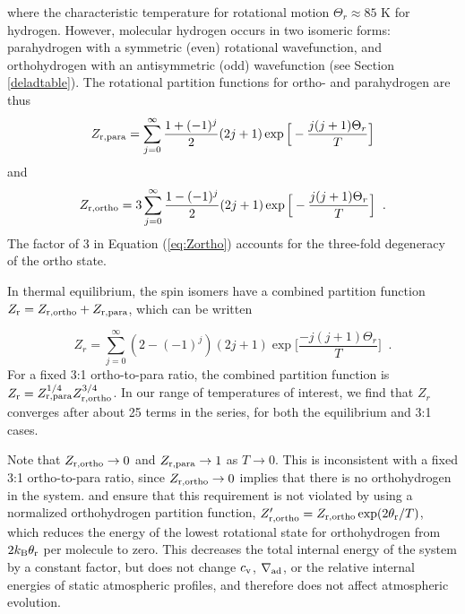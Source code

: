 \noindent where the characteristic temperature for rotational motion $\Theta_r \approx 85$ K  for hydrogen. However, molecular hydrogen occurs in two isomeric forms: parahydrogen with a symmetric (even) rotational wavefunction, and orthohydrogen with an antisymmetric (odd) wavefunction (see Section \ref{deladtable}). %
The rotational partition functions for ortho- and parahydrogen are thus
\begin{equation}
\label{eq:Zpara}
Z_{\rm{r,para}}=\sum_{j=0}^\infty \frac{1+(-1)^j}{2} (2 j +1) \exp\Big[-\frac{j(j+1)\Theta_r}{T}\Big]
\end{equation}
and
\begin{equation}
\label{eq:Zortho}
Z_{\rm{r,ortho}}=3\sum_{j=0}^\infty \frac{1-(-1)^j}{2} (2 j +1) \exp\Big[-\frac{j(j+1)\Theta_r}{T}\Big] \;\;.
\end{equation}
The factor of 3 in Equation (\ref{eq:Zortho}) accounts for the three-fold degeneracy of the ortho state.

 In thermal equilibrium, the spin isomers have a combined partition function $Z_{\rm r}=Z_{\rm{r, ortho}}+Z_{\rm{r,para}}$, which can be written

\begin{equation}
\label{eq:Zrspin}
Z_r=\sum_{j=0}^\infty (2-(-1)^j) (2j+1) \exp{\Big[\frac{-j (j+1) \Theta_r}{T}\Big]} \;\;.
\end{equation}
For a fixed 3:1 ortho-to-para ratio, the combined partition function is $Z_{\rm r}=Z_{\rm r,para}^{1/4} Z_{\rm r, ortho}^{3/4}$. In our range of temperatures of interest, we find that $Z_r$ converges after about 25 terms in the series, for both the equilibrium and 3:1 cases.

Note that $Z_{\rm r, ortho} \rightarrow 0$ and $Z_{\rm r,para} \rightarrow 1$ as $T \rightarrow 0$. This is inconsistent with a fixed 3:1 ortho-to-para ratio, since $Z_{\rm r, ortho} \rightarrow 0$ implies that there is no orthohydrogen in the system. \citet{boley07} and \citet{dangelo13} ensure that this requirement is not violated by using a normalized orthohydrogen partition function,  $Z'_{\rm r, ortho}=Z_{\rm r, ortho} \exp(2 \theta_{\rm r}/T)$, which reduces the energy of the lowest rotational state for orthohydrogen from $2k_{\rm B}\theta_{\rm r}$ per molecule to zero. This decreases the total internal energy of the system by a constant factor, but does not change $c_{\rm v}$, $\nabla_{\rm ad}$, or the relative internal energies of static atmospheric profiles, and therefore does not affect atmospheric evolution.

